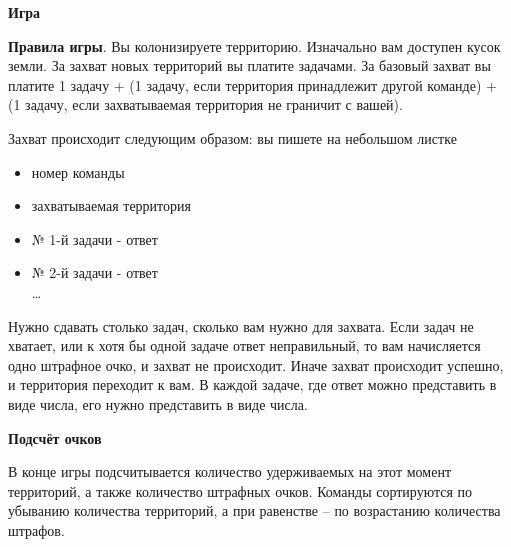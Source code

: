 \documentclass[12pt]{article}
\begin{document}
\centerline{\Large \bf Игра}
{\bf Правила игры}. Вы колонизируете территорию. Изначально вам доступен кусок земли. За захват
новых территорий вы платите задачами. За базовый захват вы платите 1 задачу + (1 задачу, если
территория принадлежит другой команде) + (1 задачу, если захватываемая территория не граничит с
вашей).

Захват происходит следующим образом: вы пишете на небольшом листке
\begin{itemize}
\item номер команды
\item захватываемая территория
\item № 1-й задачи - ответ
\item № 2-й задачи - ответ
\\
\ldots
\end{itemize}
Нужно сдавать столько задач, сколько вам нужно для захвата. Если задач не хватает, или к хотя бы одной
задаче ответ неправильный, то вам начисляется одно штрафное очко, и захват не происходит. Иначе
захват происходит успешно, и территория переходит к вам. В каждой задаче, где ответ можно
представить в виде числа, его нужно представить в виде числа.
\hr

\centerline{\large \bf Подсчёт очков}

В конце игры подсчитывается количество удерживаемых на этот момент территорий, а также количество
штрафных очков. Команды сортируются по убыванию количества территорий, а при равенстве -- по
возрастанию количества штрафов.
\hr
\end{document}
